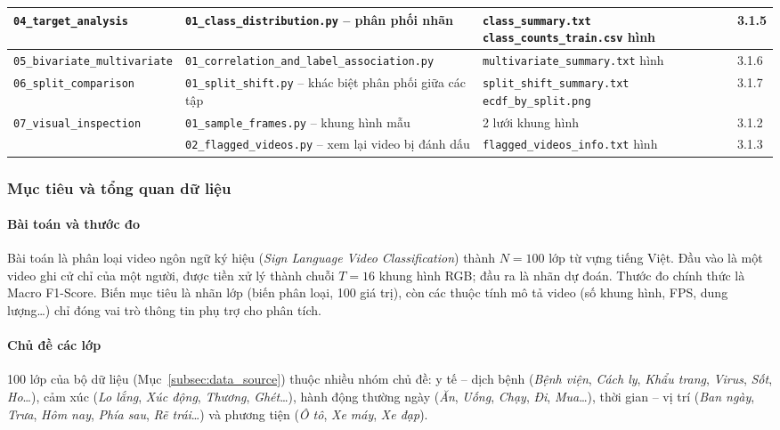 \begin{table}[H]
\begin{tabular}{@{}p{}p{}p{}p{}@{}}
    \midrule
    \texttt{04\_target\_analysis} & \texttt{01\_class\_distribution.py} -- phân phối nhãn & \texttt{class\_summary.txt} \newline \texttt{class\_counts\_train.csv} \newline 3 hình & 3.1.5 \\
    \midrule
    \texttt{05\_bivariate\_multivariate} & \texttt{01\_correlation\_and\_label\_association.py} & \texttt{multivariate\_summary.txt} \newline 3 hình & 3.1.6 \\
    \midrule
    \texttt{06\_split\_comparison} & \texttt{01\_split\_shift.py} -- khác biệt phân phối giữa các tập & \texttt{split\_shift\_summary.txt} \newline \texttt{ecdf\_by\_split.png} & 3.1.7 \\
    \midrule
    \texttt{07\_visual\_inspection} & \texttt{01\_sample\_frames.py} -- khung hình mẫu & 2 lưới khung hình & 3.1.2 \\
      & \texttt{02\_flagged\_videos.py} -- xem lại video bị đánh dấu & \texttt{flagged\_videos\_info.txt} \newline 2 hình & 3.1.3 \\
    \bottomrule
  \end{tabular}
\end{table}

\subsubsection{Mục tiêu và tổng quan dữ liệu}
\label{subsec:eda_overview}

\paragraph{Bài toán và thước đo} Bài toán là phân loại video ngôn ngữ ký hiệu (\textit{Sign Language Video Classification}) thành $N=100$ lớp từ vựng tiếng Việt. Đầu vào là một video ghi cử chỉ của một người, được tiền xử lý thành chuỗi $T=16$ khung hình RGB; đầu ra là nhãn dự đoán. Thước đo chính thức là Macro F1-Score. Biến mục tiêu là nhãn lớp (biến phân loại, 100 giá trị), còn các thuộc tính mô tả video (số khung hình, FPS, dung lượng\ldots) chỉ đóng vai trò thông tin phụ trợ cho phân tích.

\paragraph{Chủ đề các lớp} 100 lớp của bộ dữ liệu (Mục~\ref{subsec:data_source}) thuộc nhiều nhóm chủ đề: y tế -- dịch bệnh (\textit{Bệnh viện}, \textit{Cách ly}, \textit{Khẩu trang}, \textit{Virus}, \textit{Sốt}, \textit{Ho}\ldots), cảm xúc (\textit{Lo lắng}, \textit{Xúc động}, \textit{Thương}, \textit{Ghét}\ldots), hành động thường ngày (\textit{Ăn}, \textit{Uống}, \textit{Chạy}, \textit{Đi}, \textit{Mua}\ldots), thời gian -- vị trí (\textit{Ban ngày}, \textit{Trưa}, \textit{Hôm nay}, \textit{Phía sau}, \textit{Rẽ trái}\ldots) và phương tiện (\textit{Ô tô}, \textit{Xe máy}, \textit{Xe đạp}).


